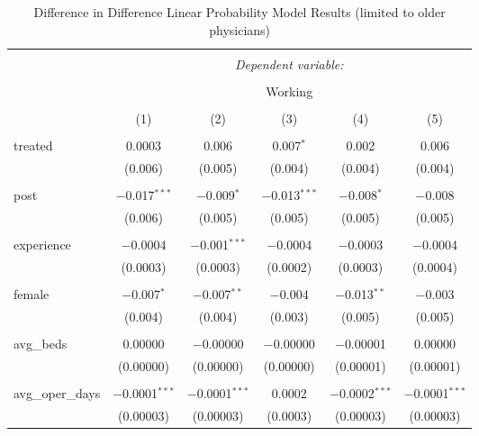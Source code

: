 
\begin{table}[!htbp] \centering 
  \caption{Difference in Difference Linear Probability Model Results (limited to older physicians)} 
  \label{} 
  \begin{adjustbox}{width=\textwidth}
\begin{tabular}{@{\extracolsep{5pt}}lccccc} 
\\[-1.8ex]\hline 
\hline \\[-1.8ex] 
 & \multicolumn{5}{c}{\textit{Dependent variable:}} \\ 
\cline{2-6} 
\\[-1.8ex] & \multicolumn{5}{c}{Working} \\ 
\\[-1.8ex] & (1) & (2) & (3) & (4) & (5)\\ 
\hline \\[-1.8ex] 
 treated & 0.0003 & 0.006 & 0.007$^{*}$ & 0.002 & 0.006 \\ 
  & (0.006) & (0.005) & (0.004) & (0.004) & (0.004) \\ 
  & & & & & \\ 
 post & $-$0.017$^{***}$ & $-$0.009$^{*}$ & $-$0.013$^{***}$ & $-$0.008$^{*}$ & $-$0.008 \\ 
  & (0.006) & (0.005) & (0.005) & (0.005) & (0.005) \\ 
  & & & & & \\ 
 experience & $-$0.0004 & $-$0.001$^{***}$ & $-$0.0004 & $-$0.0003 & $-$0.0004 \\ 
  & (0.0003) & (0.0003) & (0.0002) & (0.0003) & (0.0004) \\ 
  & & & & & \\ 
 female & $-$0.007$^{*}$ & $-$0.007$^{**}$ & $-$0.004 & $-$0.013$^{**}$ & $-$0.003 \\ 
  & (0.004) & (0.004) & (0.003) & (0.005) & (0.005) \\ 
  & & & & & \\ 
 avg\_beds & 0.00000 & $-$0.00000 & $-$0.00000 & $-$0.00001 & 0.00000 \\ 
  & (0.00000) & (0.00000) & (0.00000) & (0.00001) & (0.00001) \\ 
  & & & & & \\ 
 avg\_oper\_days & $-$0.0001$^{***}$ & $-$0.0001$^{***}$ & 0.0002 & $-$0.0002$^{***}$ & $-$0.0001$^{***}$ \\ 
  & (0.00003) & (0.00003) & (0.0003) & (0.00003) & (0.00003) \\ 

\end{tabular}
\end{adjustbox}
\end{table}
